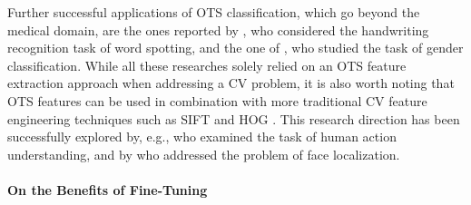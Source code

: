 Further successful applications of OTS classification, which go beyond the medical domain, are the ones reported by \citet{sharma2015adapting}, who considered the handwriting recognition task of word spotting, and the one of \citet{van2015deep}, who studied the task of gender classification. While all these researches solely relied on an OTS feature extraction approach when addressing a CV problem, it is also worth noting that OTS features can be used in combination with more traditional CV feature engineering techniques such as SIFT \cite{lowe2004distinctive} and HOG \cite{dalal2005histograms}. This research direction has been successfully explored by, e.g., \citet{wang2014action} who examined the task of human action understanding, and by \citet{zhong2016face} who addressed the problem of face localization.


\paragraph{\textbf{\uppercase{O}n the \uppercase{B}enefits of \uppercase{F}ine-\uppercase{T}uning}}
